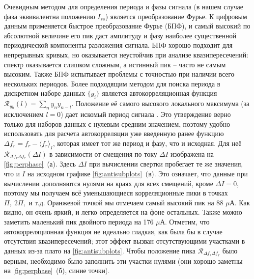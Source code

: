 \documentclass[14pt, a4paper]{extreport}
\numberwithin{equation}{section}
\begin{document}
Очевидным методом для определения периода и фазы сигнала (в нашем случае фаза эквивалентна положению $I_{ss}$) является преобразование Фурье. К цифровым данным применяется быстрое преобразование Фурье (БПФ), и самый высокий по абсолютной величине его пик даст амплитуду и фазу наиболее существенной периодической компоненты разложения сигнала. БПФ хорошо подходит для непрерывных кривых, но оказывается неустойчив при анализе квазипересечений: спектр оказывается слишком сложным, а истинный пик -- часто не самым высоким. Также БПФ испытывает проблемы с точностью при наличии всего нескольких периодов. Более подходящим методом для поиска периода в дискретном наборе данных $\{y_i\}$ является автокорреляционная функция $\mathcal{R}_{y y}(l) = \sum_n y_n y_{n-l}$. Положение её самого высокого локального максимума (за исключением $l=0$) дает искомый период сигнала \cite{parthasarathy2006}. Это утверждение верно только для наборов данных с нулевым средним значением, поэтому удобно использовать для расчета автокорреляции уже введенную ранее функцию $\Delta f_r = f_r-\langle f_r \rangle_{I}$, которая имеет тот же период и фазу, что и исходная. Для неё $\mathcal{R}_{\Delta f_r \Delta f_r}(\Delta I)$ в зависимости от смещения по току $\Delta I$ изображена на \autoref{fig:perphase}~(а). Здесь $\Delta I$ при вычислении свертки пробегает те же значения, что и $I$ на исходном графике \autoref{fig:antisubplots}~(в). Это означает, что данные при вычислении дополняются нулями на краях для всех смещений, кроме $\Delta I = 0$, поэтому мы получаем всё уменьшающиеся корреляционные пики в точках $\Pi,\ 2\Pi,$ и т.д. Оранжевой точкой мы отмечаем самый высокий пик на 88 $\mu$А. Как видно, он очень яркий, и легко определяется на фоне остальных. Также можно заметить маленький пик двойного периода на 176 $\mu$А. Отметим, что автокорреляционная функция не идеально гладкая, как была бы в случае отсутствия квазипересечений; этот эффект вызван отсутствующими участками в данных из-за плато на \autoref{fig:antisubplots}. Чтобы положение пика $\mathcal{R}_{\Delta f_r \Delta f_r}$ было верным, необходимо было заполнить эти участки нулями (они хорошо заметны на \autoref{fig:perphase}~(б), синие точки).
\end{document}
